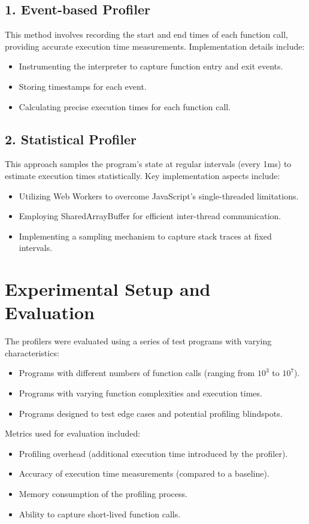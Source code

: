\documentclass[a4paper,10pt]{article}
\begin{document}
\subsection*{1. Event-based Profiler}
This method involves recording the start and end times of each function call, providing accurate execution time measurements. Implementation details include:
\begin{itemize}
    \item Instrumenting the interpreter to capture function entry and exit events.
    \item Storing timestamps for each event.
    \item Calculating precise execution times for each function call.
\end{itemize}

\subsection*{2. Statistical Profiler}
This approach samples the program's state at regular intervals (every 1ms) to estimate execution times statistically. Key implementation aspects include:
\begin{itemize}
    \item Utilizing Web Workers to overcome JavaScript's single-threaded limitations.
    \item Employing SharedArrayBuffer for efficient inter-thread communication.
    \item Implementing a sampling mechanism to capture stack traces at fixed intervals.
\end{itemize}

\section*{Experimental Setup and Evaluation}
The profilers were evaluated using a series of test programs with varying characteristics:
\begin{itemize}
    \item Programs with different numbers of function calls (ranging from $10^3$ to $10^7$).
    \item Programs with varying function complexities and execution times.
    \item Programs designed to test edge cases and potential profiling blindspots.
\end{itemize}

Metrics used for evaluation included:
\begin{itemize}
    \item Profiling overhead (additional execution time introduced by the profiler).
    \item Accuracy of execution time measurements (compared to a baseline).
    \item Memory consumption of the profiling process.
    \item Ability to capture short-lived function calls.
\end{itemize}
\end{document}
